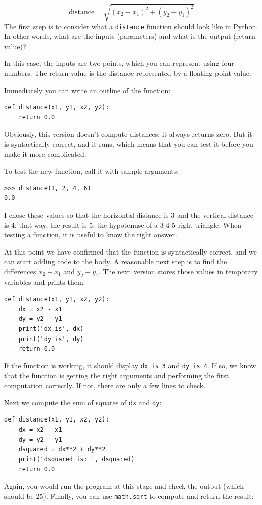 \documentclass[10pt]{book}
\begin{document}
\begin{displaymath}
\mathrm{distance} = \sqrt{(x_2 - x_1)^2 + (y_2 - y_1)^2}
\end{displaymath}
%
The first step is to consider what a {\tt distance} function should
look like in Python.  In other words, what are the inputs (parameters)
and what is the output (return value)?

In this case, the inputs are two points, which you can represent
using four numbers.  The return value is the distance represented by
a floating-point value.

Immediately you can write an outline of the function:

\begin{verbatim}
def distance(x1, y1, x2, y2):
    return 0.0
\end{verbatim}
%
Obviously, this version doesn't compute distances; it always returns
zero.  But it is syntactically correct, and it runs, which means that
you can test it before you make it more complicated.

To test the new function, call it with sample arguments:

\begin{verbatim}
>>> distance(1, 2, 4, 6)
0.0
\end{verbatim}
%
I chose these values so that the horizontal distance is 3 and the
vertical distance is 4; that way, the result is 5, the hypotenuse 
of a 3-4-5 right triangle. When testing a function, it is
useful to know the right answer.

At this point we have confirmed that the function is syntactically
correct, and we can start adding code to the body.
A reasonable next step is to find the differences
$x_2 - x_1$ and $y_2 - y_1$.  The next version stores those values in
temporary variables and prints them.

\begin{verbatim}
def distance(x1, y1, x2, y2):
    dx = x2 - x1
    dy = y2 - y1
    print('dx is', dx)
    print('dy is', dy)
    return 0.0
\end{verbatim}
%
If the function is working, it should display \verb"dx is 3" and 
\verb"dy is 4".  If so, we know that the function is getting the right
arguments and performing the first computation correctly.  If not,
there are only a few lines to check.

Next we compute the sum of squares of {\tt dx} and {\tt dy}:

\begin{verbatim}
def distance(x1, y1, x2, y2):
    dx = x2 - x1
    dy = y2 - y1
    dsquared = dx**2 + dy**2
    print('dsquared is: ', dsquared)
    return 0.0
\end{verbatim}
%
Again, you would run the program at this stage and check the output
(which should be 25).
Finally, you can use {\tt math.sqrt} to compute and return the result:
\end{document}

